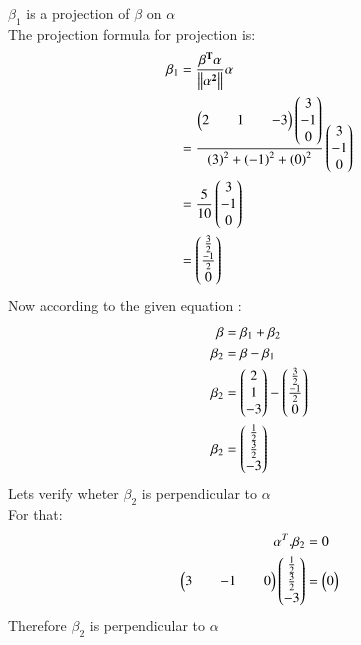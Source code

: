 \documentclass[journal]{IEEEtran}
\theoremstyle{remark}
\begin{document}
$\beta_1$ is a projection of $\beta$ on $\alpha$\\
The projection formula for projection is: 
\begin{align}
\beta_1&=\frac{\mathbf{\beta^T}\mathbf{\alpha}}{\left\lVert\mathbf{\alpha^2}\right\rVert}\mathbf{\alpha}\\
&=\frac{\begin{pmatrix}2&&1&&-3\end{pmatrix}\begin{pmatrix}3\\-1\\0\end{pmatrix}}{\left(3\right)^2+\left(-1\right)^2+\left(0\right)^2}\begin{pmatrix}3\\-1\\0\end{pmatrix}\\
&=\frac{5}{10}\begin{pmatrix}3\\-1\\0\end{pmatrix}\\
&=\begin{pmatrix}\frac{3}{2}\\ \frac{-1}{2}\\ 0\end{pmatrix}
\end{align}
Now according to the given equation :
\begin{align}
    \beta&=\beta_1+\beta_2\\
    \beta_2&=\beta-\beta_1\\
    \beta_2&=\begin{pmatrix}2\\1\\-3\end{pmatrix}-\begin{pmatrix}\frac{3}{2}\\ \frac{-1}{2}\\0\end{pmatrix}\\
    \beta_2&=\begin{pmatrix}\frac{1}{2}\\ \frac{3}{2}\\-3\end{pmatrix}
\end{align}
Lets verify wheter $\beta_2$ is perpendicular to $\alpha$\\
For that:
\begin{align}
    \alpha^T.\beta_2&=0\\
    \begin{pmatrix}3&&-1&&0\end{pmatrix}\begin{pmatrix}\frac{1}{2}\\ \frac{3}{2}\\-3\end{pmatrix}&=\begin{pmatrix}0\end{pmatrix}
\end{align}
Therefore $\beta_2$ is perpendicular to $\alpha$
\end{document}
